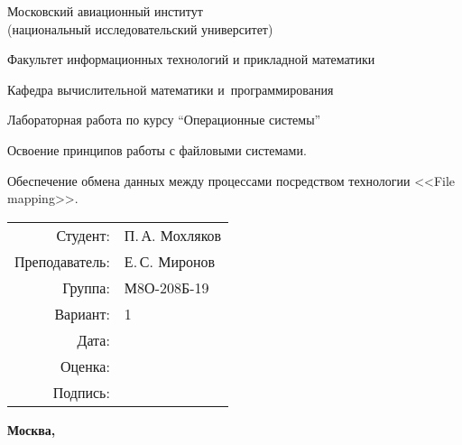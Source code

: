 \documentclass[pdf, unicode, 12pt, a4paper,oneside,fleqn]{article}
\begin{document}
\begin{titlepage}
    \begin{center}
        \bfseries

        {\Large Московский авиационный институт\\ (национальный исследовательский университет)}
        
        \vspace{48pt}
        
        {\large Факультет информационных технологий и прикладной математики}
        
        \vspace{36pt}
        
        {\large Кафедра вычислительной математики и~программирования}
        
        \vspace{48pt}
        
        Лабораторная работа  по курсу \enquote{Операционные системы}

        \vspace{48pt}

        Освоение принципов работы с файловыми системами. 
        
        Обеспечение обмена данных между процессами посредством технологии <<File mapping>>.
    \end{center}
    
    \vspace{125pt}
    
    \begin{flushright}
    \begin{tabular}{rl}
    Студент: & П.\,А. Мохляков \\
    Преподаватель: & Е.\,С. Миронов \\
    Группа: & М8О-208Б-19 \\
    Вариант: & 1 \\
    Дата: & \\
    Оценка: & \\
    Подпись: & \\
    \end{tabular}
    \end{flushright}
    
    \vfill
    
    \begin{center}
    \bfseries
    Москва, \the\year
    \end{center}
\end{titlepage}
    
\end{document}
